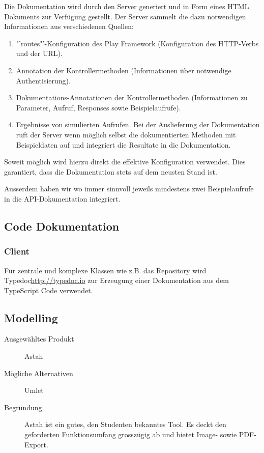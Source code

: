 				Die Dokumentation wird durch den Server generiert und in Form eines HTML Dokuments zur Verfügung gestellt. %
				Der Server sammelt die dazu notwendigen Informationen aus verschiedenen Quellen:
				\begin{enumerate}
					\item "'routes"'-Konfiguration des Play Framework (Konfiguration des HTTP-Verbs und der URL).
					\item Annotation der Kontrollermethoden (Informationen über notwendige Authentisierung).
					\item Dokumentations-Annotationen der Kontrollermethoden (Informationen zu Parameter, Aufruf, Responses sowie Beispielaufrufe).
					\item Ergebnisse von simulierten Aufrufen.
						Bei der Auslieferung der Dokumentation ruft der Server wenn möglich selbst die dokumentierten Methoden mit Beispieldaten auf und integriert die Resultate in die Dokumentation.
				\end{enumerate}
				
				Soweit möglich wird hierzu direkt die effektive Konfiguration verwendet. Dies garantiert, dass die Dokumentation stets auf dem neusten Stand ist.
				
				Ausserdem haben wir wo immer sinnvoll jeweils mindestens zwei Beispielaufrufe in die API-Dokumentation integriert.
				
				\subsection{Code Dokumentation}
					\subsubsection{Client}
						Für zentrale und komplexe Klassen wie z.B. das Repository wird Typedoc\url{http://typedoc.io}
						zur Erzeugung einer Dokumentation aus dem TypeScript Code verwendet.


		\subsection{Modelling}
			\begin{description}
				\item[Ausgewähltes Produkt] Astah
				\item[Mögliche Alternativen] Umlet
				\item[Begründung] Astah ist ein gutes, den Studenten bekanntes Tool.
					Es deckt den geforderten Funktionsumfang grosszügig ab und bietet Image- sowie PDF-Export.
			\end{description}
			
